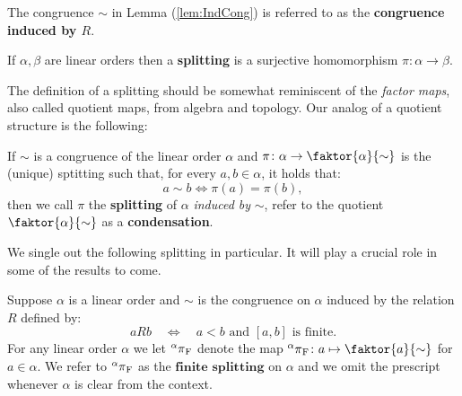 \begin{dfn}
	The congruence $\sim$ in Lemma (\ref{lem:IndCong}) is referred to as the
	\textbf{congruence induced by $R$}.
\end{dfn}

\begin{dfn}[Splitting]
	If $\alpha,\beta$ are linear orders then a \textbf{splitting} is a
	surjective homomorphism $\pi\colon\alpha\rightarrow\beta$.
\end{dfn}

The definition of a splitting should be somewhat reminiscent of the
\textit{factor maps}, also called quotient maps, from algebra and topology.  Our
analog of a quotient structure is the following:

\begin{dfn}[Condensations]
	If $\sim$ is a congruence of the linear order $\alpha$ and
	$\pi\colon\alpha\to\faktor{\alpha}{\sim}$ is the (unique) sptitting such
	that, for every $a,b\in\alpha$, it holds that: \begin{equation} a\sim b\iff
	\pi(a)=\pi(b), \end{equation} then we call $\pi$ the \textbf{splitting} of
	$\alpha$ \textit{induced by} $\sim$, refer to the quotient
	$\faktor{\alpha}{\sim}$ as a \textbf{condensation}.
\end{dfn}

We single out the following splitting in particular.  It will play a crucial
role in some of the results to come.

\begin{dfn}
	Suppose $\alpha$ is a linear order and $\sim$ is the congruence on $\alpha$ induced by the relation $R$ defined by:
	\begin{equation}
		aRb\quad\iff\quad a<b\text{ and }[a,b]\text{ is finite}.
	\end{equation}
	For any linear order $\alpha$ we let $\fsplit[\alpha]$ denote the map
	$\fsplit[\alpha]\colon a\mapsto\faktor{a}{\sim}$ for $a\in\alpha$.  We refer
	to $\fsplit[\alpha]$ as the $\textbf{finite splitting}$ on $\alpha$ and we
	omit the prescript whenever $\alpha$ is clear from the context.
\end{dfn}

